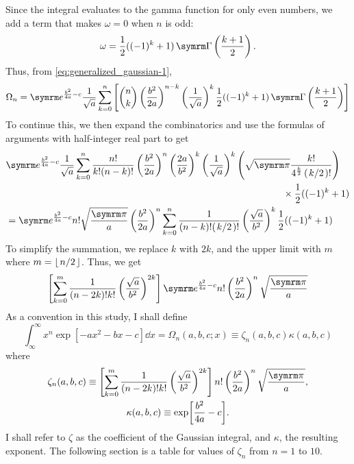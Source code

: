 Since the integral evaluates to the gamma function for only even numbers, we add a term that makes $\omega = 0$ when $n$ is odd:
\begin{equation}
    \omega = \frac{1}{2}((-1)^k + 1)\fgamma\left(\frac{k + 1}{2}\right).
\end{equation}
Thus, from \cref{eq:generalized_gaussian-1},
\begin{equation}
    \Omega_n = \e^{\frac{b^2}{4a} - c}\frac{1}{\sqrt{a}}\sum_{k = 0}^{n}\left[{n \choose k}\left(\frac{b^2}{2a}\right)^{n - k}\left(\frac{1}{\sqrt{a}}\right)^{k} \frac{1}{2}((-1)^k + 1)\fgamma\left(\frac{k + 1}{2}\right)\right]
\end{equation}
To continue this, we then expand the combinatorics and use the formulas of arguments with half-integer real part to get
\begin{align}
    &\begin{multlined}
    \e^{\frac{b^2}{4a} - c}\frac{1}{\sqrt{a}}\sum_{k = 0}^{n}\frac{n!}{k!(n - k)!}\left(\frac{b^2}{2a}\right)^n\left(\frac{2a}{b^2}\right)^k\left(\frac{1}{\sqrt{a}}\right)^k\left(\sqrt{\cpi}\frac{k!}{4^{\frac{k}{2}}\left(\flatfrac{k}{2}\right)!}\right) \\
    \times \frac{1}{2}((-1)^k + 1)
    \end{multlined} \\
    &= \e^{\frac{b^2}{4a} - c}n!\sqrt{\frac{\cpi}{a}}\left(\frac{b^2}{2a}\right)^n\sum_{k = 0}^n\frac{1}{(n - k)!(\flatfrac{k}{2})!}\left(\frac{\sqrt{a}}{b^2}\right)^{k}\frac{1}{2}((-1)^k + 1)
\end{align}
To simplify the summation, we replace $k$ with $2k$, and the upper limit with $m$ where $m = \left\lfloor\flatfrac{n}{2}\right\rfloor$. Thus, we get
\begin{equation}
    \left[\sum_{k = 0}^{m}\frac{1}{(n - 2k)!k!}\left(\frac{\sqrt{a}}{b^2}\right)^{2k}\right]\e^{\frac{b^2}{4a} - c}n!\left(\frac{b^2}{2a}\right)^n\sqrt{\frac{\cpi}{a}}
\end{equation}
As a convention in this study, I shall define
\begin{equation}
    \int_{\infty}^{\infty}x^n\exp[-ax^2 - bx - c]\dd{x} = \Omega_n(a, b, c; x) \equiv \zeta_n(a, b, c)\kappa(a, b, c) 
\end{equation}
where
\begin{gather}
    \zeta_n(a, b, c) \equiv \left[\sum_{k = 0}^{m}\frac{1}{(n - 2k)!k!}\left(\frac{\sqrt{a}}{b^2}\right)^{2k}\right]n!\left(\frac{b^2}{2a}\right)^n\sqrt{\frac{\cpi}{a}}, \\
    \kappa(a, b, c) \equiv \exp[\frac{b^2}{4a} - c].
\end{gather}
I shall refer to $\zeta$ as the coefficient of the Gaussian integral, and $\kappa$, the resulting exponent. The following section is a table for values of $\zeta_n$ from $n = 1$ to $10$. 

